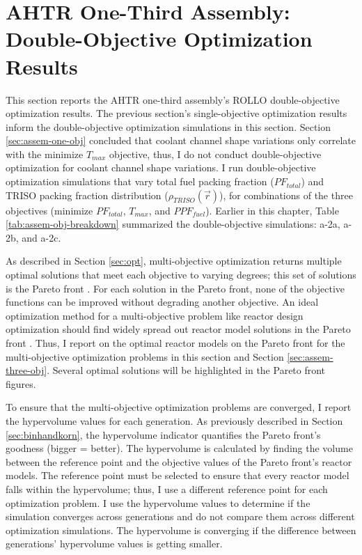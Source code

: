 \section{AHTR One-Third Assembly: Double-Objective Optimization Results}
\label{sec:assem-two-obj}
This section reports the \gls{AHTR} one-third assembly's \gls{ROLLO} double-objective 
optimization results. 
The previous section's single-objective optimization results inform the double-objective 
optimization simulations in this section.
Section \ref{sec:assem-one-obj} concluded that coolant channel shape variations 
only correlate with the minimize $T_{max}$ objective, thus, I do not conduct 
double-objective optimization for coolant channel shape variations.
I run double-objective optimization simulations that vary total fuel packing 
fraction ($PF_{total}$) and \gls{TRISO} packing fraction distribution 
($\rho_{TRISO}(\vec{r})$), for combinations of the three objectives (minimize 
$PF_{total}$, $T_{max}$, and $PPF_{fuel}$). 
Earlier in this chapter, Table \ref{tab:assem-obj-breakdown} summarized the 
double-objective simulations: a-2a, a-2b, and a-2c.

As described in Section \ref{sec:opt}, multi-objective optimization returns 
multiple optimal solutions that meet each objective to varying degrees; this set of 
solutions is the Pareto front \cite{deb_multi-objective_2001}. 
For each solution in the Pareto front, none of the objective functions can be 
improved without degrading another objective.
An ideal optimization method for a multi-objective problem like reactor design 
optimization should find widely spread out reactor model solutions in the Pareto front 
\cite{deb_multi-objective_2001}. 
Thus, I report on the optimal reactor models on the Pareto front for the 
multi-objective optimization problems in this section and Section 
\ref{sec:assem-three-obj}. 
Several optimal solutions will be highlighted in the Pareto front figures. 

To ensure that the multi-objective optimization problems are converged, I report the 
hypervolume values for each generation. 
As previously described in Section \ref{sec:binhandkorn}, the hypervolume indicator 
quantifies the Pareto front's goodness (bigger = better).
The hypervolume is calculated by finding the volume between the reference point and 
the objective values of the Pareto front's reactor models. 
The reference point must be selected to ensure that every reactor model falls within 
the hypervolume; thus, I use a different reference point for each optimization problem.
I use the hypervolume values to determine if the simulation converges across generations 
and do not compare them across different optimization simulations.
The hypervolume is converging if the difference between generations' hypervolume values 
is getting smaller. 


